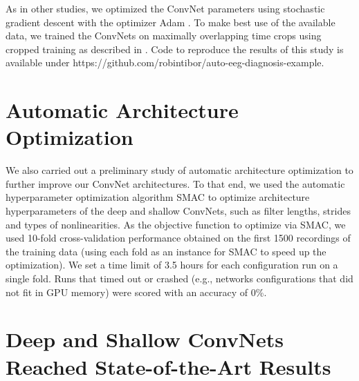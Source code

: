     As in other studies, we optimized the ConvNet parameters using
stochastic gradient descent with the optimizer Adam
\cite{kingma_adam:_2014}. To make best use of the available
data, we trained the ConvNets on maximally overlapping time crops using
cropped training as described in . Code
to reproduce the results of this study is available under
https://github.com/robintibor/auto-eeg-diagnosis-example.

\section{Automatic Architecture
Optimization}\label{automatic-architecture-optimization}

    We also carried out a preliminary study of automatic architecture
optimization to further improve our ConvNet architectures. To that end,
we used the automatic hyperparameter optimization algorithm SMAC
\citep{hutter_sequential_2011} to optimize architecture
hyperparameters of the deep and shallow ConvNets, such as filter
lengths, strides and types of nonlinearities. As the objective function
to optimize via SMAC, we used 10-fold cross-validation performance
obtained on the first 1500 recordings of the training data (using each
fold as an instance for SMAC to speed up the optimization). We set a
time limit of 3.5 hours for each configuration run on a single fold.
Runs that timed out or crashed (e.g., networks configurations that did
not fit in GPU memory) were scored with an accuracy of 0\%.

\section{Deep and Shallow ConvNets Reached State-of-the-Art
Results}\label{deep-and-shallow-convnets-reached-state-of-the-art-results}

